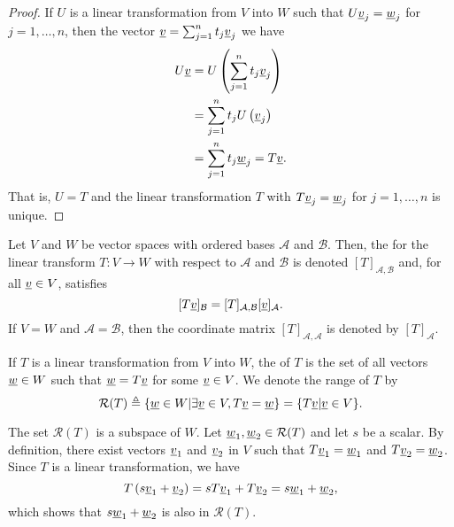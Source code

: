 \begin{proof}
If $U$ is a linear transformation from $V$ into $W$ such that $U \underline{v}_j = \underline{w}_j$ for $j = 1, \ldots, n$, then the vector $\underline{v} = \sum_{j=1}^n t_j \underline{v}_j$ we have
\begin{equation*}
\begin{split}
U \underline{v} &= U \left( \sum_{j=1}^n t_j \underline{v}_j \right) \\
&= \sum_{j=1}^n t_j U \left( \underline{v}_j \right) \\
&= \sum_{j=1}^n t_j \underline{w}_j
= T \underline{v} .
\end{split}
\end{equation*}
That is, $U = T$ and the linear transformation $T$ with $T \underline{v}_j = \underline{w}_j$ for $j = 1, \ldots, n$ is unique.
\end{proof}
\fi

\begin{definition}
Let $V$ and $W$ be vector spaces with ordered bases $\mathcal{A}$ and $\mathcal{B}$.
Then, the  for the linear transform $T\colon V \to W$ with respect to $\mathcal{A}$ and $\mathcal{B}$ is denoted $[T]_{\mathcal{A},\mathcal{B}}$ and, for all $\underline{v} \in V$, satisfies
\[ [T \underline{v}]_{\mathcal{B}} = [T]_{\mathcal{A},\mathcal{B}} [\underline{v}]_{\mathcal{A}}.  \]
If $V=W$ and $\mathcal{A}=\mathcal{B}$, then the coordinate matrix  $[T]_{\mathcal{A},\mathcal{A}}$ is denoted by $[T]_{\mathcal{A}}$.
\end{definition}

\begin{definition}
If $T$ is a linear transformation from $V$ into $W$, the  of $T$ is the set of all vectors $\underline{w} \in W$ such that $\underline{w} = T \underline{v}$ for some $\underline{v} \in V$.
We denote the range of $T$ by
\[ \mathcal{R}(T) \triangleq \{ \underline{w}\in W | \exists \underline{v}\in V, T\underline{v} = \underline{w} \} = \{ T \underline{v} | \underline{v} \in V\}. \]
\end{definition}
The set $\mathcal{R}(T)$ is a subspace of $W$.
Let $\underline{w}_1, \underline{w}_2 \in \mathcal{R}(T)$ and let $s$ be a scalar.
By definition, there exist vectors $\underline{v}_1$ and $\underline{v}_2$ in $V$ such that $T \underline{v}_1 = \underline{w}_1$ and $T \underline{v}_2 = \underline{w}_2$.
Since $T$ is a linear transformation, we have
\begin{equation*}
T \left( s \underline{v}_1 + \underline{v}_2 \right) = s T \underline{v}_1 + T \underline{v}_2 = s \underline{w}_1 + \underline{w}_2 ,
\end{equation*}
which shows that $s \underline{w}_1 + \underline{w}_2$ is also in $\mathcal{R}(T)$.

